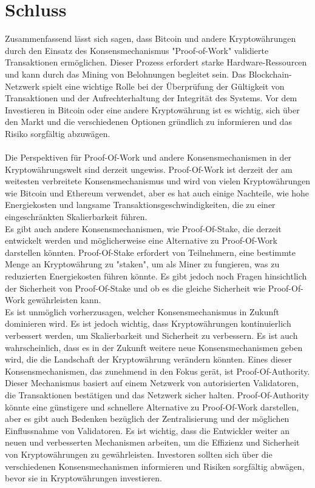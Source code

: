 \documentclass[ngerman]{scrreprt}
\begin{document}
\chapter{Schluss}
Zusammenfassend lässt sich sagen, dass Bitcoin und andere Kryptowährungen durch den Einsatz des Konsensmechanismus "Proof-of-Work" validierte Transaktionen ermöglichen. Dieser Prozess erfordert starke Hardware-Ressourcen und kann durch das Mining von Belohnungen begleitet sein. Das Blockchain-Netzwerk spielt eine wichtige Rolle bei der Überprüfung der Gültigkeit von Transaktionen und der Aufrechterhaltung der Integrität des Systems. Vor dem Investieren in Bitcoin oder eine andere Kryptowährung ist es wichtig, sich über den Markt und die verschiedenen Optionen gründlich zu informieren und das Risiko sorgfältig abzuwägen.\\ \\

Die Perspektiven für Proof-Of-Work und andere Konsensmechanismen in der Kryptowährungswelt sind derzeit ungewiss. Proof-Of-Work ist derzeit der am weitesten verbreitete Konsensmechanismus und wird von vielen Kryptowährungen wie Bitcoin und Ethereum verwendet, aber es hat auch einige Nachteile, wie hohe Energiekosten und langsame Transaktionsgeschwindigkeiten, die zu einer eingeschränkten Skalierbarkeit führen. \\

Es gibt auch andere Konsensmechanismen, wie Proof-Of-Stake, die derzeit entwickelt werden und möglicherweise eine Alternative zu Proof-Of-Work darstellen könnten. Proof-Of-Stake erfordert von Teilnehmern, eine bestimmte Menge an Kryptowährung zu "staken", um als Miner zu fungieren, was zu reduzierten Energiekosten führen könnte. Es gibt jedoch noch Fragen hinsichtlich der Sicherheit von Proof-Of-Stake und ob es die gleiche Sicherheit wie Proof-Of-Work gewährleisten kann.\\ 

Es ist unmöglich vorherzusagen, welcher Konsensmechanismus in Zukunft dominieren wird. Es ist jedoch wichtig, dass Kryptowährungen kontinuierlich verbessert werden, um Skalierbarkeit und Sicherheit zu verbessern. Es ist auch wahrscheinlich, dass es in der Zukunft weitere neue Konsensmechanismen geben wird, die die Landschaft der Kryptowährung verändern könnten. Eines dieser Konsensmechanismen, das zunehmend in den Fokus gerät, ist Proof-Of-Authority. Dieser Mechanismus basiert auf einem Netzwerk von autorisierten Validatoren, die Transaktionen bestätigen und das Netzwerk sicher halten. Proof-Of-Authority könnte eine günstigere und schnellere Alternative zu Proof-Of-Work darstellen, aber es gibt auch Bedenken bezüglich der Zentralisierung und der möglichen Einflussnahme von Validatoren. Es ist wichtig, dass die Entwickler weiter an neuen und verbesserten Mechanismen arbeiten, um die Effizienz und Sicherheit von Kryptowährungen zu gewährleisten. Investoren sollten sich über die verschiedenen Konsensmechanismen informieren und Risiken sorgfältig abwägen, bevor sie in Kryptowährungen investieren.

\printbibliography
\end{document}
